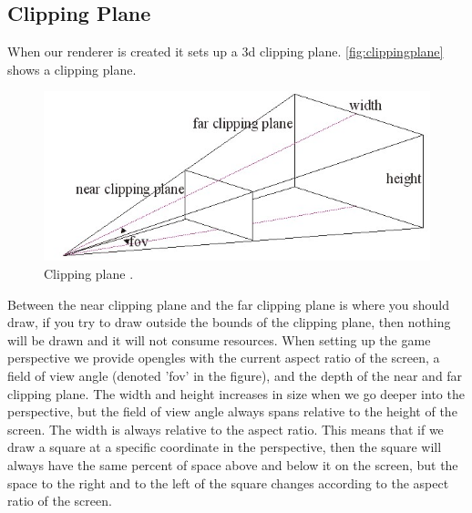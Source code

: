 \subsection{Clipping Plane}

When our renderer is created it sets up a \ac{3d} clipping plane. \autoref{fig:clippingplane} shows a clipping plane.
\begin{figure}[H]
\centering
\includegraphics[width=0.9\linewidth]{img/clippingplane.jpg}
\caption{Clipping plane \citep{clippingplane}.}
\label{fig:clippingplane}
\end{figure}
Between the near clipping plane and the far clipping plane is where you should draw, if you try to draw outside the bounds of the clipping plane, then nothing will be drawn and it will not consume resources. When setting up the game perspective we provide \ac{opengles} with the current aspect ratio of the screen, a field of view angle (denoted 'fov' in the figure), and the depth of the near and far clipping plane. The width and height increases in size when we go deeper into the perspective, but the field of view angle always spans relative to the height of the screen. The width is always relative to the aspect ratio. This means that if we draw a square at a specific coordinate in the perspective, then the square will always have the same percent of space above and below it on the screen, but the space to the right and to the left of the square changes according to the aspect ratio of the screen.

